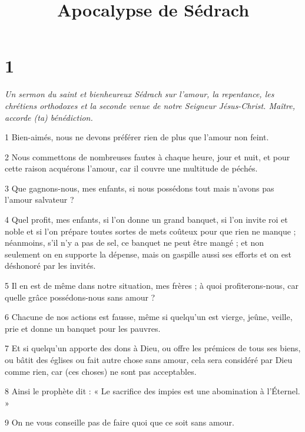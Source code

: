 

\title{Apocalypse de Sédrach}

\chapter{1}

\par \textit{Un sermon du saint et bienheureux Sédrach sur l'amour, la repentance, les chrétiens orthodoxes et la seconde venue de notre Seigneur Jésus-Christ. Maître, accorde (ta) bénédiction.}

\par 1 Bien-aimés, nous ne devons préférer rien de plus que l'amour non feint.

\par 2 Nous commettons de nombreuses fautes à chaque heure, jour et nuit, et pour cette raison acquérons l'amour, car il couvre une multitude de péchés.

\par 3 Que gagnons-nous, mes enfants, si nous possédons tout mais n'avons pas l'amour salvateur ?

\par 4 Quel profit, mes enfants, si l'on donne un grand banquet, si l'on invite roi et noble et si l'on prépare toutes sortes de mets coûteux pour que rien ne manque ; néanmoins, s’il n’y a pas de sel, ce banquet ne peut être mangé ; et non seulement on en supporte la dépense, mais on gaspille aussi ses efforts et on est déshonoré par les invités.

\par 5 Il en est de même dans notre situation, mes frères ; à quoi profiterons-nous, car quelle grâce possédons-nous sans amour ?

\par 6 Chacune de nos actions est fausse, même si quelqu'un est vierge, jeûne, veille, prie et donne un banquet pour les pauvres.

\par 7 Et si quelqu'un apporte des dons à Dieu, ou offre les prémices de tous ses biens, ou bâtit des églises ou fait autre chose sans amour, cela sera considéré par Dieu comme rien, car (ces choses) ne sont pas acceptables.

\par 8 Ainsi le prophète dit : « Le sacrifice des impies est une abomination à l'Éternel. »

\par 9 On ne vous conseille pas de faire quoi que ce soit sans amour.


